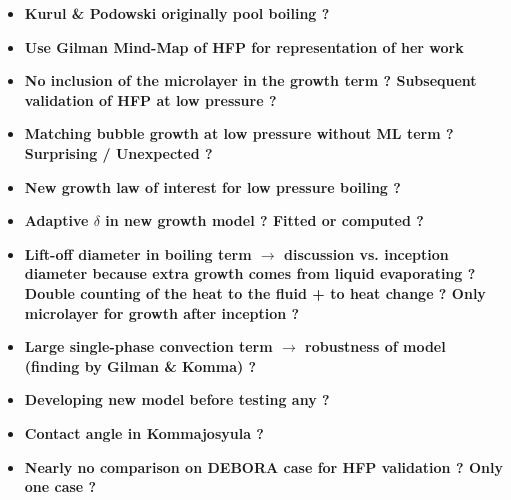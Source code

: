 \documentclass[8pt, a4paper]{article}
\begin{document}
\begin{itemize}
\setlength{\itemsep}{45pt}


\item \textbf{Kurul \& Podowski originally pool boiling ?}



\item \textbf{Use Gilman Mind-Map of HFP for representation of her work}



\item \textbf{No inclusion of the microlayer in the growth term ? Subsequent validation of HFP at low pressure ?}



\item \textbf{Matching bubble growth at low pressure without ML term ? Surprising / Unexpected ?}




\item \textbf{New growth law of interest for low pressure boiling ?}


\item \textbf{Adaptive $\delta$ in new growth model ? Fitted or computed ?}



\item \textbf{Lift-off diameter in boiling term $\rightarrow$ discussion vs. inception diameter because extra growth comes from liquid evaporating ? Double counting of the heat to the fluid + to heat change ? Only microlayer for growth after inception ?}




\item \textbf{Large single-phase convection term $\rightarrow$ robustness of model (finding by Gilman \& Komma) ?}



\item \textbf{Developing new model before testing any ?}





\item \textbf{Contact angle in Kommajosyula ?}



\item \textbf{Nearly no comparison on DEBORA case for HFP validation ? Only one case ?}



\end{itemize}
\end{document}
